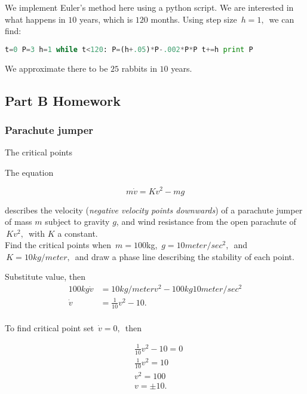 We implement Euler's method here using a python script.
We are interested in what happens in $10$ years,
which is $120$ months. Using step size $\, h=1, \,$ we can find:

\begin{lstlisting}[language=Python]
t=0 P=3 h=1 while t<120: P=(h+.05)*P-.002*P*P t+=h print P 
\end{lstlisting}

We approximate there to be $25$ rabbits in $10$ years.

\clearpage

\subsection{Part B Homework}

\subsubsection{Parachute jumper}

\begin{problem}
  The critical points
\end{problem}

The equation

\begin{equation*}
  m \dot v = Kv^2 - mg 
\end{equation*}

describes the velocity (\emph{negative velocity points downwards})
of a parachute jumper of mass $m$ subject to gravity $g$, and wind resistance
from the open parachute of $\, Kv^2, \,$ with $K$ a constant.\\

Find the critical points when $\, m = 100$kg, $\, g = 10 meter/sec^2,\,$ and 
$\, K=10kg/meter, \,$ and draw a phase line describing the stability of each point.

Substitute value, then
\begin{align*}
  100kg \dot v &= 10kg/meter v^2 - 100kg 10 meter/sec^2 \\
  \dot v &= \frac{1}{10} v^2 - 10. \\ 
\end{align*}

To find critical point set $\, \dot v = 0, \,$ then

\begin{align*}
  & \frac{1}{10} v^2  - 10 = 0 \\
  & \frac{1}{10} v^2   = 10 \\
  & v^2   = 100 \\
  & v = \pm 10. 
\end{align*}

